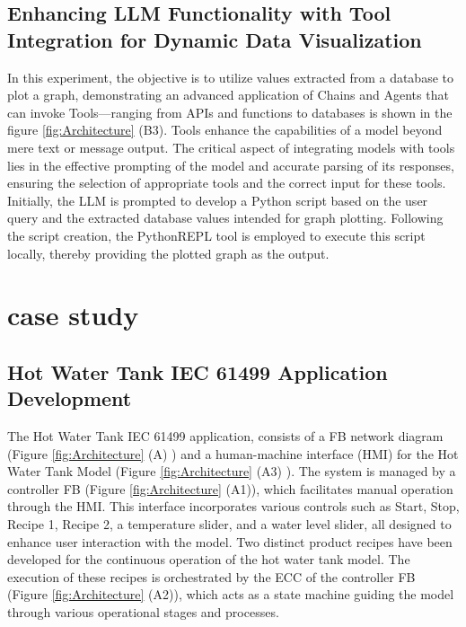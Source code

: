 \begin{bibunit}
\subsection{Enhancing LLM Functionality with Tool Integration for Dynamic Data Visualization}

In this experiment, the objective is to utilize values extracted from a database to plot a graph, demonstrating an advanced application of Chains and Agents that can invoke Tools—ranging from APIs and functions to databases is shown in the figure \ref{fig:Architecture} (B3). Tools enhance the capabilities of a model beyond mere text or message output. The critical aspect of integrating models with tools lies in the effective prompting of the model and accurate parsing of its responses, ensuring the selection of appropriate tools and the correct input for these tools. Initially, the LLM is prompted to develop a Python script based on the user query and the extracted database values intended for graph plotting. Following the script creation, the PythonREPL tool is employed to execute this script locally, thereby providing the plotted graph as the output. 


\section{case study}
\label{sec:casestudy}


\subsection{Hot Water Tank IEC 61499 Application Development}

The Hot Water Tank IEC 61499 application, consists of a FB network diagram (Figure  \ref{fig:Architecture} (A) ) and a human-machine interface (HMI) for the Hot Water Tank Model (Figure \ref{fig:Architecture} (A3) ). The system is managed by a controller FB (Figure \ref{fig:Architecture} (A1)), which facilitates manual operation through the HMI. This interface incorporates various controls such as Start, Stop, Recipe 1, Recipe 2, a temperature slider, and a water level slider, all designed to enhance user interaction with the model. Two distinct product recipes have been developed for the continuous operation of the hot water tank model. The execution of these recipes is orchestrated by the ECC of the controller FB (Figure \ref{fig:Architecture} (A2)), which acts as a state machine guiding the model through various operational stages and processes.


\end{bibunit}
